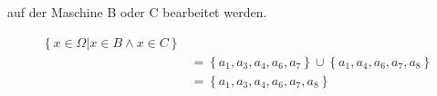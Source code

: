 auf der Maschine B oder C  bearbeitet werden.

\begin{align}
	 \left\{x \in \Omega \vert x\in B \land x\in C\right\}\\
	 &= \left\{a_1,a_3,a_4,a_6, a_7\right\} \cup \left\{ a_1, a_4, a_6, a_7, a_8 \right\}\\
	& = \left\{a_1, a_3, a_4,a_6,a_7,a_8\right\} 
\end{align}
